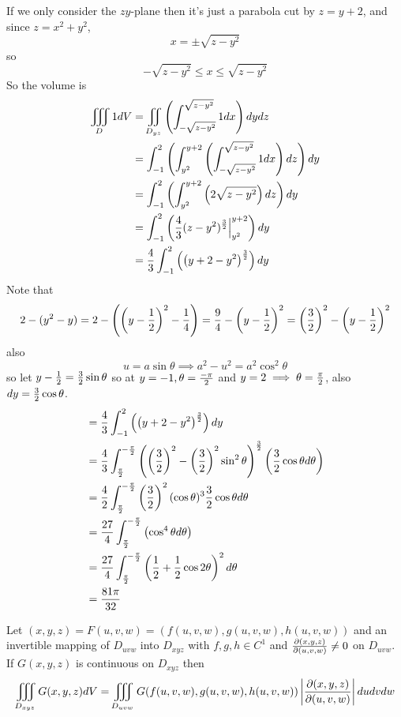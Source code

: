 \documentclass[english, 11pt]{article}
\begin{document}
If we only consider the $zy$-plane then it's just a parabola cut by $z= y + 2$, and since $z = x^2 + y^2$,
\[ x = \pm \sqrt{z - y^2} \]
so
\[-\sqrt{z - y^2} \leq x \leq \sqrt{z - y^2}  \]
So the volume is
\begin{align*}
  \iiint\displaylimits_D 1 dV & = \iint\displaylimits_{D_{yz}} \left( \int_{-\sqrt{z-y^2}}^{\sqrt{z-y^2}} 1 dx \right) dydz \\
  & = \int_{-1}^2 \left( \int_{y^2}^{y+2} \left( \int_{-\sqrt{z-y^2}}^{\sqrt{z-y^2}} 1 dx \right)dz \right) dy \\
  & = \int_{-1}^2 \left( \int_{y^2}^{y+2} \left( 2\sqrt{z-y^2} \right)dz \right) dy \\
  & = \int_{-1}^2 \left( \frac{4}{3}(z-y^2)^{\frac{3}{2}} \Big|_{y^2}^{y+2} \right) dy \\
  & = \frac{4}{3} \int_{-1}^2 \left( \left( y + 2 - y^2 \right)^{\frac{3}{2}} \right) dy
\end{align*}
Note that
\[ 2 - (y^2 - y) = 2 - \left( \left( y - \frac{1}{2} \right)^2 - \frac{1}{4} \right) = \frac{9}{4} - \left( y - \frac{1}{2} \right)^2 = \left( \frac{3}{2} \right)^2 - \left( y - \frac{1}{2} \right)^2 \]
also
\[ u = a\sin \theta \implies a^2 - u^2 = a^2 \cos^2\theta \]
so let $y - \frac{1}{2} = \frac{3}{2}\sin\theta$ so at $y = -1, \theta = \frac{-\pi}{2}$ and $y = 2 \implies \theta = \frac{\pi}{2}$, also $dy = \frac{3}{2}\cos \theta$.
\begin{align*}
 & = \frac{4}{3} \int_{-1}^2 \left( \left( y + 2 - y^2 \right)^{\frac{3}{2}} \right) dy \\
  & = \frac{4}{3} \int_{\frac{\pi}{2}}^{-\frac{\pi}{2}} \left( \left( \frac{3}{2} \right)^2 - \left( \frac{3}{2} \right)^2 \sin^2\theta \right)^{\frac{3}{2}} \left( \frac{3}{2}\cos\theta d\theta \right) \\
  & = \frac{4}{2} \int_{\frac{\pi}{2}}^{-\frac{\pi}{2}} \left( \frac{3}{2} \right)^2 (\cos \theta)^3 \frac{3}{2} \cos \theta d \theta \\
  & = \frac{27}{4} \int_{\frac{\pi}{2}}^{-\frac{\pi}{2}} \left( \cos^4 \theta d\theta  \right) \\
  & = \frac{27}{4} \int_{\frac{\pi}{2}}^{-\frac{\pi}{2}} \left( \frac{1}{2} + \frac{1}{2} \cos 2\theta \right)^2 d\theta \\
  & = \frac{81\pi}{32}
\end{align*}

\begin{thrm}\label{changevariables}
  Let $(x,y,z) = F(u,v,w) = (f(u,v,w), g(u,v,w), h(u,v,w))$ and an invertible mapping of $D_{uvw}$ into $D_{xyz}$ with $f,g,h \in C^1$ and $\frac{\partial(x,y,z)}{\partial(u,v,w)} \not = 0$ on $D_{uvw}$. If $G(x,y,z)$ is continuous on $D_{xyz}$ then
  \[ \iiint\displaylimits_{D_{xyz}} G(x,y,z) dV = \iiint\displaylimits_{D_{uvw}} G(f(u,v,w), g(u,v,w), h(u,v,w)) \left| \frac{\partial(x,y,z)}{\partial(u,v,w)} \right| dudvdw \]
\end{thrm}
\end{document}
